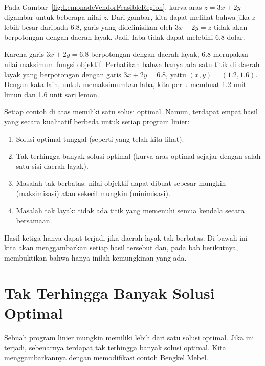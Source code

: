 \begin{solution}
Pada Gambar~\ref{fig:LemonadeVendorFeasibleRegion}, kurva aras \(z = 3x+2y\)
digambar untuk beberapa nilai \(z\). Dari gambar, kita dapat melihat bahwa jika \(z\) lebih besar daripada 6.8,
garis yang didefinisikan oleh \(3x+2y = z\) tidak akan berpotongan dengan
daerah layak. Jadi, laba tidak dapat melebihi 6.8 dolar.

Karena garis \(3x+2y = 6.8\) berpotongan dengan daerah layak, \(6.8\)
merupakan nilai maksimum fungsi objektif. Perhatikan bahwa hanya ada satu
titik di daerah layak yang berpotongan dengan garis \(3x+2y=6.8\),
yaitu $(x,y) = (1.2,1.6)$.
Dengan kata lain, untuk memaksimumkan laba, kita perlu membuat 1.2 unit
limun dan 1.6 unit sari lemon.
\end{solution}

Setiap contoh di atas memiliki satu solusi optimal. Namun, terdapat empat hasil yang secara kualitatif berbeda untuk setiap program linier:
\begin{enumerate}[nosep]
\item Solusi optimal tunggal (seperti yang telah kita lihat).
\item Tak terhingga banyak solusi optimal (kurva aras optimal sejajar dengan salah satu sisi daerah layak).
\item Masalah tak berbatas: nilai objektif dapat dibuat sebesar mungkin (maksimisasi) atau sekecil mungkin (minimisasi).
\item Masalah tak layak: tidak ada titik yang memenuhi semua kendala secara bersamaan.
\end{enumerate}

Hasil ketiga hanya dapat terjadi jika daerah layak tak berbatas. Di bawah ini kita akan menggambarkan setiap hasil tersebut dan, pada bab berikutnya, membuktikan bahwa hanya inilah kemungkinan yang ada.

\section{Tak Terhingga Banyak Solusi Optimal}\label{sec:infinitely-many-optima}

Sebuah program linier mungkin memiliki lebih dari satu solusi optimal. Jika ini terjadi, sebenarnya terdapat tak terhingga banyak solusi optimal. Kita menggambarkannya dengan memodifikasi contoh Bengkel Mebel.


